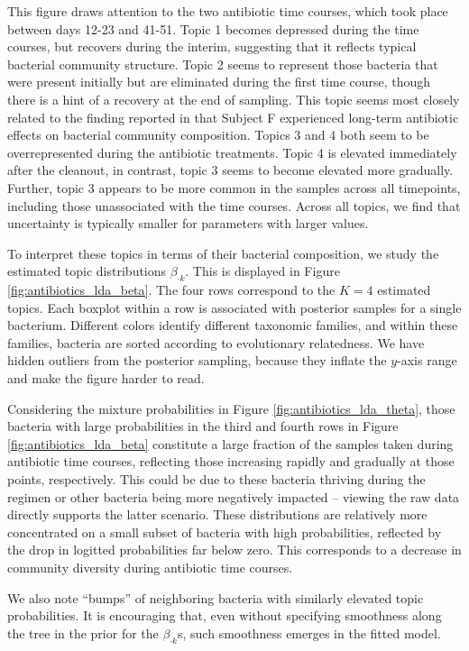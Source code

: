 \documentclass[oupdraft]{bio}
\begin{document}
This figure draws attention to the two antibiotic time courses, which took place
between days 12-23 and 41-51. Topic 1 becomes depressed during the time courses,
but recovers during the interim, suggesting that it reflects typical bacterial
community structure. Topic 2 seems to represent those bacteria that were present
initially but are eliminated during the first time course, though there is a
hint of a recovery at the end of sampling. This topic seems most closely related
to the finding reported in \citep{dethlefsen2011incomplete} that Subject F
experienced long-term antibiotic effects on bacterial community composition.
Topics 3 and 4 both seem to be overrepresented during the antibiotic treatments.
Topic 4 is elevated immediately after the cleanout, in contrast, topic 3 seems
to become elevated more gradually. Further, topic 3 appears to be more common in
the samples across all timepoints, including those unassociated with the time
courses. Across all topics, we find that uncertainty is typically smaller for
parameters with larger values.

To interpret these topics in terms of their bacterial composition, we study the
estimated topic distributions $\beta_{\cdot k}$. This is displayed in Figure
\ref{fig:antibiotics_lda_beta}. The four rows correspond to the $K = 4$
estimated topics. Each boxplot within a row is associated with posterior samples
for a single bacterium. Different colors identify different taxonomic families,
and within these families, bacteria are sorted according to evolutionary
relatedness. We have hidden outliers from the posterior sampling, because they
inflate the $y$-axis range and make the figure harder to read.

Considering the mixture probabilities in Figure \ref{fig:antibiotics_lda_theta},
those bacteria with large probabilities in the third and fourth rows in Figure
\ref{fig:antibiotics_lda_beta} constitute a large fraction of the samples taken
during antibiotic time courses, reflecting those increasing rapidly and
gradually at those points, respectively. This could be due to these bacteria
thriving during the regimen or other bacteria being more negatively impacted --
viewing the raw data directly supports the latter scenario. These distributions
are relatively more concentrated on a small subset of bacteria with high
probabilities, reflected by the drop in logitted probabilities far below zero.
This corresponds to a decrease in community diversity during antibiotic time
courses.

We also note ``bumps'' of neighboring bacteria with similarly elevated topic
probabilities. It is encouraging that, even without specifying smoothness along
the tree in the prior for the $\beta_{\cdot k}$s, such smoothness emerges in the
fitted model.
\end{document}
